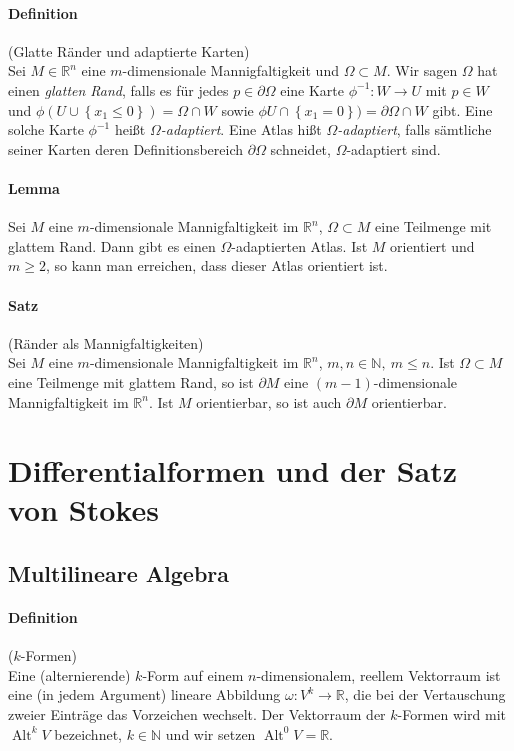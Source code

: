 \documentclass[12pt,a4paper,fleqn]{article}
\def\set#1{{\left\{ #1 \right\}}}
\def\R{{\mathbb{R}}}
\begin{document}
\paragraph{Definition} (Glatte Ränder und adaptierte Karten)\\
Sei $M \in \R^n$ eine $m$-dimensionale Mannigfaltigkeit und $\Omega \subset M$. Wir sagen $\Omega$ hat einen \textit{glatten Rand}, falls es für jedes $p \in \partial\Omega$ eine Karte $\phi^{-1}\colon W \rightarrow U$ mit $p \in W$ und $\phi(U \cup \set{x_1 \leq 0}) = \Omega \cap W$ sowie $\phi U \cap \set{x_1 = 0}) = \partial \Omega \cap W$ gibt. Eine solche Karte $\phi^{-1}$ heißt $\Omega$\textit{-adaptiert}. Eine Atlas hißt $\Omega$\textit{-adaptiert}, falls sämtliche seiner Karten deren Definitionsbereich $\partial\Omega$ schneidet, $\Omega$-adaptiert sind.

\paragraph{Lemma} Sei $M$ eine $m$-dimensionale Mannigfaltigkeit im $\R^n$, $\Omega \subset M$ eine Teilmenge mit glattem Rand. Dann gibt es einen $\Omega$-adaptierten Atlas. Ist $M$ orientiert und $m \geq 2$, so kann man erreichen, dass dieser Atlas orientiert ist.

\paragraph{Satz} (Ränder als Mannigfaltigkeiten)\\
Sei $M$ eine $m$-dimensionale Mannigfaltigkeit im $\R^n$, $m, n \in \mathbb{N},\ m \leq n$. Ist $\Omega \subset M$ eine Teilmenge mit glattem Rand, so ist $\partial M$ eine $(m - 1)$-dimensionale Mannigfaltigkeit im $\R^n$. Ist $M$ orientierbar, so ist auch $\partial M$ orientierbar.

\section{Differentialformen und der Satz von Stokes}

\subsection{Multilineare Algebra}

\paragraph{Definition} ($k$-Formen)\\
Eine (alternierende) $k$-Form auf einem $n$-dimensionalem, reellem Vektorraum ist eine (in jedem Argument) lineare Abbildung $\omega\colon V^k \rightarrow \R$, die bei der Vertauschung zweier Einträge das Vorzeichen wechselt. Der Vektorraum der $k$-Formen wird mit $\operatorname{Alt}^k V$ bezeichnet, $k \in \mathbb{N}$ und wir setzen $\operatorname{Alt}^0 V = \R$.
\end{document}
